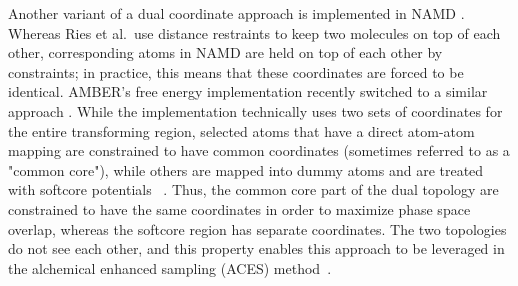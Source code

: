 \documentclass[9pt,bestpractices]{livecoms}
\begin{document}
Another variant of a dual coordinate approach is implemented in NAMD \cite{jiang2019computing}. Whereas Ries et al.~use distance restraints to keep two molecules on top of each other, corresponding atoms in NAMD are held on top of each other by constraints; in practice, this means that these coordinates are forced to be identical. AMBER's free energy implementation recently switched to a similar approach \cite{lee2023aces,York_ACSPhysChemAu_2023_v3_p478}.
While the implementation technically uses two sets of coordinates for the entire transforming region, selected atoms that have a direct atom-atom mapping are constrained to have common coordinates (sometimes referred to as a "common core"), while others are mapped into dummy atoms and are treated with softcore potentials~\cite{Lee_JChemTheoryComput_2020_v16_p5512,Tsai_JChemTheoryComput_2023_v19_p640} .  Thus, the common core part of the dual topology are constrained to have the same coordinates in order to maximize phase space overlap, whereas the softcore region has separate coordinates.  The two topologies do not see each other, and this property enables this approach to be leveraged in the alchemical enhanced sampling (ACES) method~\cite{lee2023aces,Tsai_JChemInfModel_2024_v64_p7046,Zhang_JChemTheoryComput_2024_v20_p3935}.
\end{document}
